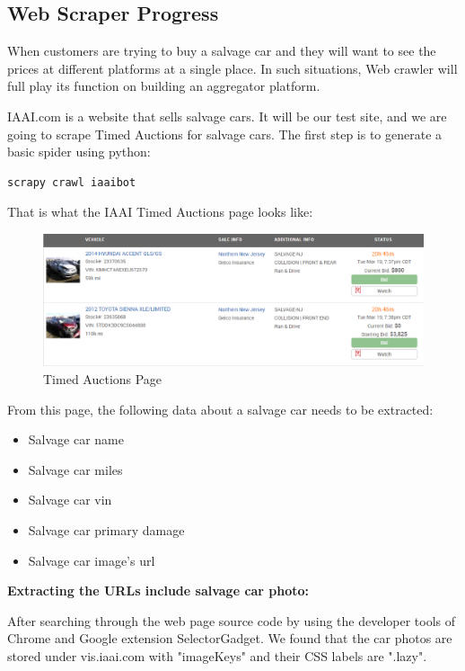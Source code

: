 \documentclass[onecolumn, draftclsnofoot,10pt, compsoc]{IEEEtran}
\begin{document}
\subsection{Web Scraper Progress}
When customers are trying to buy a salvage car and they will want to see the prices at different platforms at a single place. In such situations, Web crawler will full play its function on building an aggregator platform.

IAAI.com is a website that sells salvage cars.\cite{IAAI} It will be our test site, and we are going to scrape Timed Auctions for salvage cars. The first step is to generate a basic spider using python:

\begin{verbatim}
scrapy crawl iaaibot

\end{verbatim}

That is what the IAAI Timed Auctions page looks like:

\begin{figure}[H]
\centering
\includegraphics[scale=0.5]{timed_auction}
\caption{Timed Auctions Page}
\label{fig:auction}
\end{figure}

From this page, the following data about a salvage car needs to be extracted:

\begin{itemize}
\item Salvage car name
\item Salvage car miles
\item Salvage car vin
\item Salvage car primary damage
\item Salvage car image's url
\end{itemize}

\textbf{Extracting the URLs include salvage car photo:}

After searching through the web page source code by using the developer tools of Chrome and Google extension SelectorGadget. We found that the car photos are stored under vis.iaai.com with "imageKeys" and their CSS labels are ".lazy".
\end{document}
